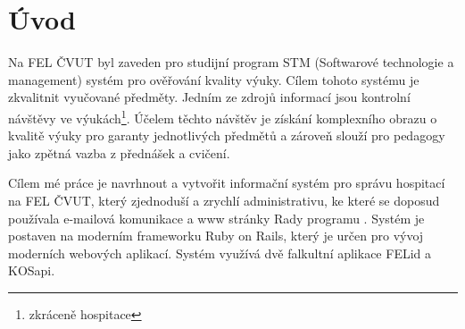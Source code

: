 \chapter{Úvod}

Na FEL ČVUT byl zaveden pro studijní program STM (Softwarové technologie a management) systém pro ověřování kvality výuky. Cílem tohoto systému je zkvalitnit vyučované předměty. Jedním ze zdrojů informací jsou kontrolní návštěvy ve výukách\footnote{zkráceně hospitace}. Účelem těchto návštěv je získání komplexního obrazu o kvalitě výuky pro garanty jednotlivých předmětů a zároveň slouží pro pedagogy jako zpětná vazba z přednášek a cvičení.

Cílem mé práce je navrhnout a vytvořit informační systém pro správu hospitací na FEL ČVUT, který zjednoduší a zrychlí administrativu, ke které se doposud používala e-mailová komunikace a www stránky Rady programu \cite{kvalitavyukyweb}. Systém je postaven na moderním frameworku Ruby on Rails, který je určen pro vývoj moderních webových aplikací. Systém využívá dvě falkultní aplikace FELid a KOSapi.
